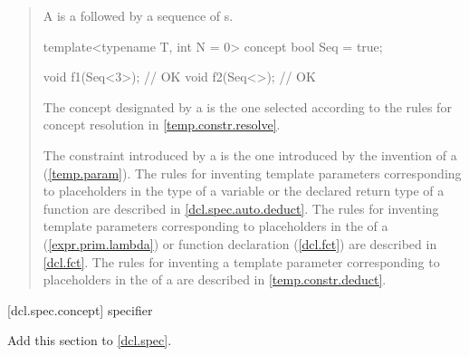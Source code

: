 \begin{quote}
\pnum
A  is a  followed 
by a sequence of s.
%
\enterexample
\begin{codeblock}
template<typename T, int N = 0> concept bool Seq = true;

void f1(Seq<3>); // OK
void f2(Seq<>);  // OK
\end{codeblock}
\exitexample

\pnum
The concept designated by a 
is the one selected according to the rules for concept resolution in
\ref{temp.constr.resolve}.

\pnum
\enternote
The constraint introduced by a  
is the one introduced by the invention of a 
 (\ref{temp.param}).
%
The rules for inventing template parameters corresponding to placeholders
in the type of a variable or the declared return type of a function are
described in \ref{dcl.spec.auto.deduct}.
% 
The rules for inventing template parameters corresponding to placeholders
in the  of a
 (\ref{expr.prim.lambda})
or function declaration (\ref{dcl.fct}) are described in
\ref{dcl.fct}.
% 
The rules for inventing a template parameter corresponding to placeholders
in the  of a 
 are described in 
\ref{temp.constr.deduct}.
\exitnote
\end{quote}


[dcl.spec.concept]{ specifier}

Add this section to \ref{dcl.spec}.

